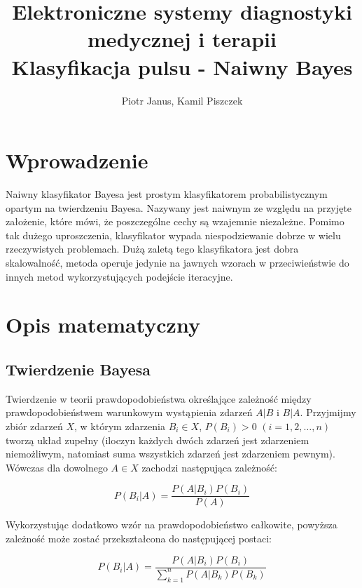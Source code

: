 \documentclass[10pt,a4paper]{article}
\begin{document}
	\title{Elektroniczne systemy diagnostyki medycznej i terapii \\  Klasyfikacja pulsu - Naiwny Bayes}
	\author{Piotr Janus, Kamil Piszczek}
	\date{}
	\maketitle

\section{Wprowadzenie}
\label{sec_wprowadzenie}

Naiwny klasyfikator Bayesa jest prostym klasyfikatorem probabilistycznym opartym na twierdzeniu Bayesa. Nazywany jest naiwnym ze względu na przyjęte założenie, które mówi, że poszczególne cechy są wzajemnie niezależne. Pomimo tak dużego uproszczenia, klasyfikator wypada niespodziewanie dobrze w wielu rzeczywistych problemach. Dużą zaletą tego klasyfikatora jest dobra skalowalność, metoda operuje jedynie na jawnych wzorach w przeciwieństwie do innych metod wykorzystujących podejście iteracyjne.


\section{Opis matematyczny}
\label{sec_opis_mat}

\subsection{Twierdzenie Bayesa}
\label{subsec_tw_bayesa}
Twierdzenie w teorii prawdopodobieństwa określające zależność między prawdopodobieństwem warunkowym wystąpienia zdarzeń $A|B$ i $B|A$. Przyjmijmy zbiór zdarzeń $X$, w którym zdarzenia $B_i \in X$, $P(B_i)>0$ ${(i=1,2, \dots , n)}$ tworzą układ zupełny (iloczyn każdych dwóch zdarzeń jest zdarzeniem niemożliwym, natomiast suma wszystkich zdarzeń jest zdarzeniem pewnym). Wówczas dla dowolnego $A \in X$ zachodzi następująca zależność:

	\begin{equation}
	\label{eq_tw_bayesa_1}
		P(B_i | A) = \frac{P(A | B_i) P(B_i)}{P(A)}
	\end{equation}

Wykorzystując dodatkowo wzór na prawdopodobieństwo całkowite, powyższa zależność może zostać przekształcona do następującej postaci:

	\begin{equation}
	\label{eq_tw_bayesa_2}
		P(B_i | A) = \frac{P(A | B_i) P(B_i)}{\sum_{k=1}^{n} P(A | B_k)P(B_k)}
	\end{equation}
\end{document}
